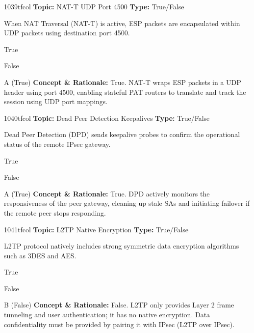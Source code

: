 \begin{qcard}{1039}{tfcol}
\textcolor{darkslate!75}{\small\textbf{Topic:} NAT-T UDP Port 4500 \hfill \textbf{Type:} True/False}\vspace{0.4em}\par
When NAT Traversal (NAT-T) is active, ESP packets are encapsulated within UDP packets using destination port 4500.
\begin{qoptions}
\item True
\item False
\end{qoptions}
\end{qcard}
\nopagebreak
\begin{explainbox}{A (True)}
\textbf{Concept \& Rationale:} True. NAT-T wraps ESP packets in a UDP header using port 4500, enabling stateful PAT routers to translate and track the session using UDP port mappings.
\end{explainbox}

\begin{qcard}{1040}{tfcol}
\textcolor{darkslate!75}{\small\textbf{Topic:} Dead Peer Detection Keepalives \hfill \textbf{Type:} True/False}\vspace{0.4em}\par
Dead Peer Detection (DPD) sends keepalive probes to confirm the operational status of the remote IPsec gateway.
\begin{qoptions}
\item True
\item False
\end{qoptions}
\end{qcard}
\nopagebreak
\begin{explainbox}{A (True)}
\textbf{Concept \& Rationale:} True. DPD actively monitors the responsiveness of the peer gateway, cleaning up stale SAs and initiating failover if the remote peer stops responding.
\end{explainbox}

\begin{qcard}{1041}{tfcol}
\textcolor{darkslate!75}{\small\textbf{Topic:} L2TP Native Encryption \hfill \textbf{Type:} True/False}\vspace{0.4em}\par
L2TP protocol natively includes strong symmetric data encryption algorithms such as 3DES and AES.
\begin{qoptions}
\item True
\item False
\end{qoptions}
\end{qcard}
\nopagebreak
\begin{explainbox}{B (False)}
\textbf{Concept \& Rationale:} False. L2TP only provides Layer 2 frame tunneling and user authentication; it has no native encryption. Data confidentiality must be provided by pairing it with IPsec (L2TP over IPsec).
\end{explainbox}

